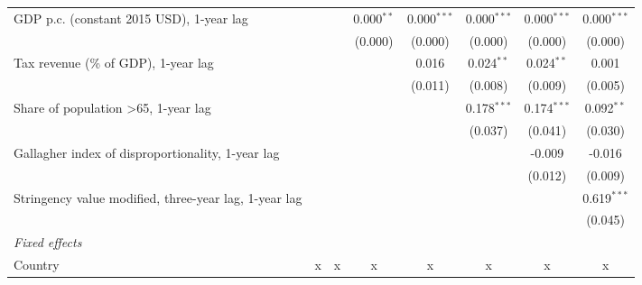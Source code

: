 \begin{table}[htbp]
\begin{tabular}{lccccccc}
      GDP p.c. (constant 2015 USD), 1-year lag                              &                &                & 0.000$^{**}$   & 0.000$^{***}$  & 0.000$^{***}$  & 0.000$^{***}$  & 0.000$^{***}$\\   
                                                                            &                &                & (0.000)        & (0.000)        & (0.000)        & (0.000)        & (0.000)\\   
      Tax revenue (\% of GDP), 1-year lag                                   &                &                &                & 0.016          & 0.024$^{**}$   & 0.024$^{**}$   & 0.001\\   
                                                                            &                &                &                & (0.011)        & (0.008)        & (0.009)        & (0.005)\\   
      Share of population >65, 1-year lag                                   &                &                &                &                & 0.178$^{***}$  & 0.174$^{***}$  & 0.092$^{**}$\\   
                                                                            &                &                &                &                & (0.037)        & (0.041)        & (0.030)\\   
      Gallagher index of disproportionality, 1-year lag                     &                &                &                &                &                & -0.009         & -0.016\\   
                                                                            &                &                &                &                &                & (0.012)        & (0.009)\\   
      Stringency value modified, three-year lag, 1-year lag                 &                &                &                &                &                &                & 0.619$^{***}$\\   
                                                                            &                &                &                &                &                &                & (0.045)\\   
      \emph{Fixed effects}\\
      Country                                                               & x              & x              & x              & x              & x              & x              & x\\  

\end{tabular}
\end{table}
